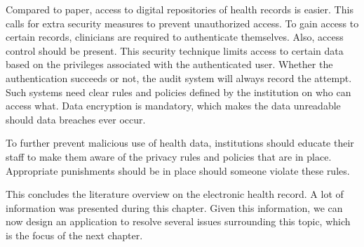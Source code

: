     Compared to paper, access to digital repositories of health records is easier. This calls for extra security measures to prevent unauthorized access. To gain access to certain records, clinicians are required to authenticate themselves. Also, access control should be present. This security technique limits access to certain data based on the privileges associated with the authenticated user. Whether the authentication succeeds or not, the audit system will always record the attempt. Such systems need clear rules and policies defined by the institution on who can access what. Data encryption is mandatory, which makes the data unreadable should data breaches ever occur.

    To further prevent malicious use of health data, institutions should educate their staff to make them aware of the privacy rules and policies that are in place. Appropriate punishments should be in place should someone violate these rules.\bigskip

    \noindent This concludes the literature overview on the electronic health record. A lot of information was presented during this chapter. Given this information, we can now design an application to resolve several issues surrounding this topic, which is the focus of the next chapter.